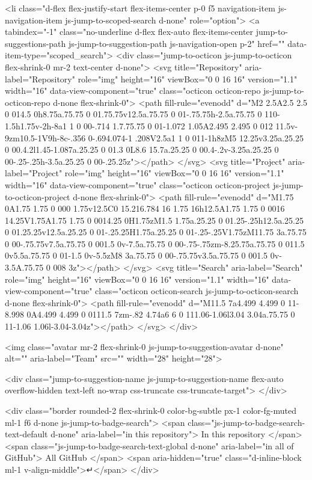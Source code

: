 <li class="d-flex flex-justify-start flex-items-center p-0 f5 navigation-item js-navigation-item js-jump-to-scoped-search d-none" role="option">
  <a tabindex="-1" class="no-underline d-flex flex-auto flex-items-center jump-to-suggestions-path js-jump-to-suggestion-path js-navigation-open p-2" href="" data-item-type="scoped_search">
    <div class="jump-to-octicon js-jump-to-octicon flex-shrink-0 mr-2 text-center d-none">
      <svg title="Repository" aria-label="Repository" role="img" height="16" viewBox="0 0 16 16" version="1.1" width="16" data-view-component="true" class="octicon octicon-repo js-jump-to-octicon-repo d-none flex-shrink-0">
    <path fill-rule="evenodd" d="M2 2.5A2.5 2.5 0 014.5 0h8.75a.75.75 0 01.75.75v12.5a.75.75 0 01-.75.75h-2.5a.75.75 0 110-1.5h1.75v-2h-8a1 1 0 00-.714 1.7.75.75 0 01-1.072 1.05A2.495 2.495 0 012 11.5v-9zm10.5-1V9h-8c-.356 0-.694.074-1 .208V2.5a1 1 0 011-1h8zM5 12.25v3.25a.25.25 0 00.4.2l1.45-1.087a.25.25 0 01.3 0L8.6 15.7a.25.25 0 00.4-.2v-3.25a.25.25 0 00-.25-.25h-3.5a.25.25 0 00-.25.25z"></path>
</svg>
      <svg title="Project" aria-label="Project" role="img" height="16" viewBox="0 0 16 16" version="1.1" width="16" data-view-component="true" class="octicon octicon-project js-jump-to-octicon-project d-none flex-shrink-0">
    <path fill-rule="evenodd" d="M1.75 0A1.75 1.75 0 000 1.75v12.5C0 15.216.784 16 1.75 16h12.5A1.75 1.75 0 0016 14.25V1.75A1.75 1.75 0 0014.25 0H1.75zM1.5 1.75a.25.25 0 01.25-.25h12.5a.25.25 0 01.25.25v12.5a.25.25 0 01-.25.25H1.75a.25.25 0 01-.25-.25V1.75zM11.75 3a.75.75 0 00-.75.75v7.5a.75.75 0 001.5 0v-7.5a.75.75 0 00-.75-.75zm-8.25.75a.75.75 0 011.5 0v5.5a.75.75 0 01-1.5 0v-5.5zM8 3a.75.75 0 00-.75.75v3.5a.75.75 0 001.5 0v-3.5A.75.75 0 008 3z"></path>
</svg>
      <svg title="Search" aria-label="Search" role="img" height="16" viewBox="0 0 16 16" version="1.1" width="16" data-view-component="true" class="octicon octicon-search js-jump-to-octicon-search d-none flex-shrink-0">
    <path fill-rule="evenodd" d="M11.5 7a4.499 4.499 0 11-8.998 0A4.499 4.499 0 0111.5 7zm-.82 4.74a6 6 0 111.06-1.06l3.04 3.04a.75.75 0 11-1.06 1.06l-3.04-3.04z"></path>
</svg>
    </div>

    <img class="avatar mr-2 flex-shrink-0 js-jump-to-suggestion-avatar d-none" alt="" aria-label="Team" src="" width="28" height="28">

    <div class="jump-to-suggestion-name js-jump-to-suggestion-name flex-auto overflow-hidden text-left no-wrap css-truncate css-truncate-target">
    </div>

    <div class="border rounded-2 flex-shrink-0 color-bg-subtle px-1 color-fg-muted ml-1 f6 d-none js-jump-to-badge-search">
      <span class="js-jump-to-badge-search-text-default d-none" aria-label="in this repository">
        In this repository
      </span>
      <span class="js-jump-to-badge-search-text-global d-none" aria-label="in all of GitHub">
        All GitHub
      </span>
      <span aria-hidden="true" class="d-inline-block ml-1 v-align-middle">↵</span>
    </div>

